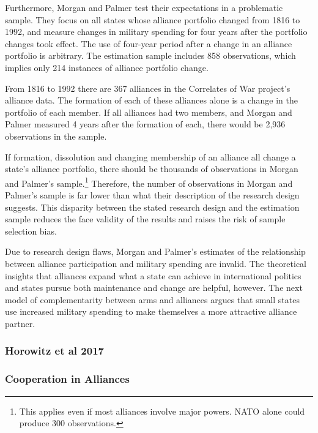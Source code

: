\documentclass[12pt]{article}
\begin{document}
Furthermore, Morgan and Palmer test their expectations in a problematic sample.
They focus on all states whose alliance portfolio changed from 1816 to 1992, and measure changes in military spending for four years after the portfolio changes took effect.
The use of four-year period after a change in an alliance portfolio is arbitrary. 
The estimation sample includes 858 observations, which implies only 214 instances of alliance portfolio change.  


From 1816 to 1992 there are 367 alliances in the Correlates of War project's alliance data.
The formation of each of these alliances alone is a change in the portfolio of each member. 
If all alliances had two members, and Morgan and Palmer measured 4 years after the formation of each, there would be 2,936 observations in the sample. 


If formation, dissolution and changing membership of an alliance all change a state's alliance portfolio, there should be thousands of observations in Morgan and Palmer's sample.\footnote{This applies even if most alliances involve major powers. NATO alone could produce 300 observations.} 
Therefore, the number of observations in Morgan and Palmer's sample is far lower than what their description of the research design suggests.
This disparity between the stated research design and the estimation sample reduces the face validity of the results and raises the risk of sample selection bias. 


Due to research design flaws, Morgan and Palmer's estimates of the relationship between alliance participation and military spending are invalid. 
The theoretical insights that alliances expand what a state can achieve in international politics and states pursue both maintenance and change are helpful, however. 
The next model of complementarity between arms and alliances argues that small states use increased military spending to make themselves a more attractive alliance partner. 



\subsubsection{Horowitz et al 2017} 





\subsubsection{Cooperation in Alliances} 
\end{document}

